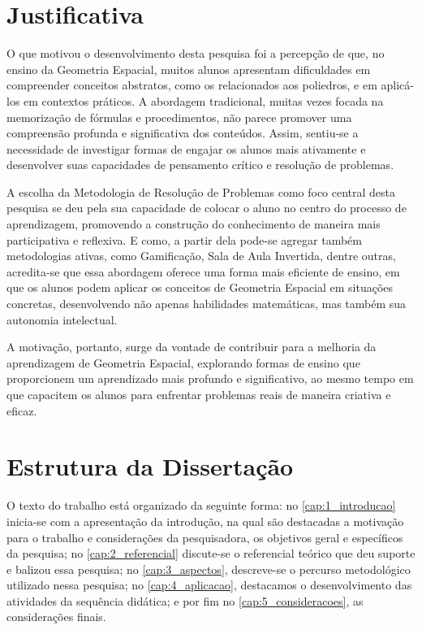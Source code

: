 \begin{enumerate}
\end{enumerate}

\section{Justificativa}

O que motivou o desenvolvimento desta pesquisa foi a percepção de que, no ensino da Geometria Espacial, muitos alunos apresentam dificuldades em compreender conceitos abstratos, como os relacionados aos poliedros, e em aplicá-los em contextos práticos. A abordagem tradicional, muitas vezes focada na memorização de fórmulas e procedimentos, não parece promover uma compreensão profunda e significativa dos conteúdos. Assim, sentiu-se a necessidade de investigar formas de engajar os alunos mais ativamente e desenvolver suas capacidades de pensamento crítico e resolução de problemas.

A escolha da Metodologia de Resolução de Problemas como foco central desta pesquisa se deu pela sua capacidade de colocar o aluno no centro do processo de aprendizagem, promovendo a construção do conhecimento de maneira mais participativa e reflexiva. E como, a partir dela pode-se agregar também metodologias ativas, como Gamificação, Sala de Aula Invertida, dentre outras, acredita-se que essa abordagem oferece uma forma mais eficiente de ensino, em que os alunos podem aplicar os conceitos de Geometria Espacial em situações concretas, desenvolvendo não apenas habilidades matemáticas, mas também sua autonomia intelectual.

A motivação, portanto, surge da vontade de contribuir para a melhoria da aprendizagem de Geometria Espacial, explorando formas de ensino que proporcionem um aprendizado mais profundo e significativo, ao mesmo tempo em que capacitem os alunos para enfrentar problemas reais de maneira criativa e eficaz.

\section{Estrutura da Dissertação}

O texto do trabalho está organizado da seguinte forma: no \autoref{cap:1_introducao} inicia-se com a apresentação da introdução, na qual são destacadas a motivação para o trabalho e considerações da pesquisadora, os objetivos geral e específicos da pesquisa; no \autoref{cap:2_referencial} discute-se o referencial teórico que deu suporte e balizou essa pesquisa; no \autoref{cap:3_aspectos}, descreve-se o percurso metodológico utilizado nessa pesquisa; no \autoref{cap:4_aplicacao}, destacamos o desenvolvimento das atividades da sequência didática; e por fim no \autoref{cap:5_consideracoes}, as considerações finais.


